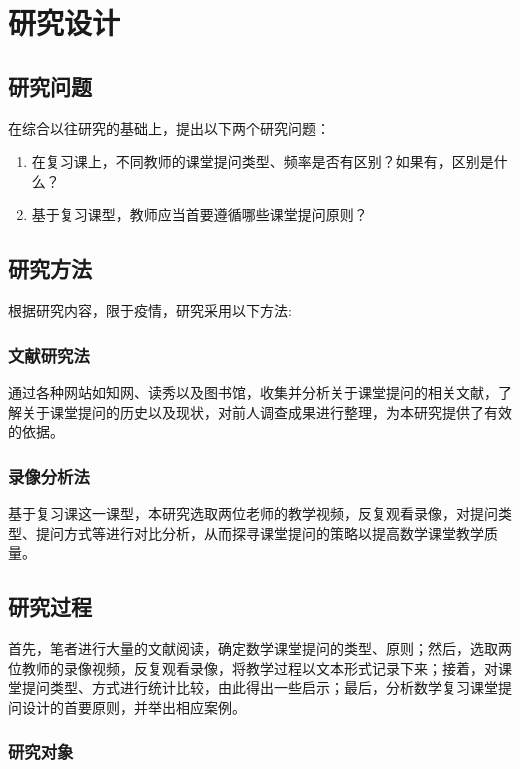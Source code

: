 \chapter{研究设计}


\section{研究问题}

在综合以往研究的基础上，提出以下两个研究问题：
\begin{enumerate}
  \item 在复习课上，不同教师的课堂提问类型、频率是否有区别？如果有，区别是什么？
  \item 基于复习课型，教师应当首要遵循哪些课堂提问原则？
\end{enumerate}



\section{研究方法}

根据研究内容，限于疫情，研究采用以下方法:


\subsection{文献研究法}

通过各种网站如知网、读秀以及图书馆，收集并分析关于课堂提问的相关文献，了解关于课堂提问的历史以及现状，对前人调查成果进行整理，为本研究提供了有效的依据。


\subsection{录像分析法}

基于复习课这一课型，本研究选取两位老师的教学视频，反复观看录像，对提问类型、提问方式等进行对比分析，从而探寻课堂提问的策略以提高数学课堂教学质量。



\section{研究过程}

首先，笔者进行大量的文献阅读，确定数学课堂提问的类型、原则；然后，选取两位教师的录像视频，反复观看录像，将教学过程以文本形式记录下来；接着，对课堂提问类型、方式进行统计比较，由此得出一些启示；最后，分析数学复习课堂提问设计的首要原则，并举出相应案例。


\subsection{研究对象}

